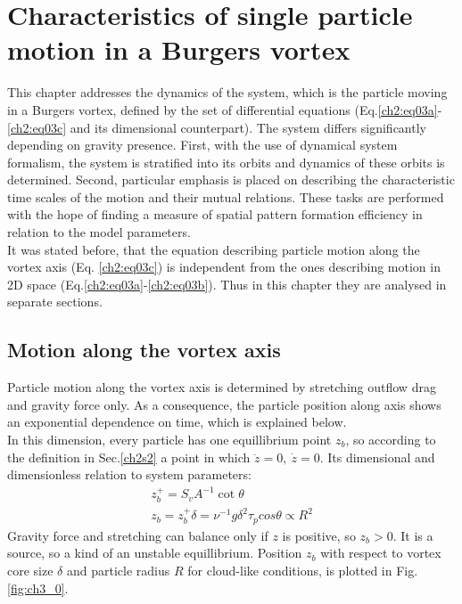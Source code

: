 \documentclass[../main.tex]{subfiles}
\begin{document}
\chapter{Characteristics of single particle motion in a Burgers vortex} %

\label{ch:single} %

This chapter addresses the dynamics of the system, which is the particle moving in a Burgers vortex, defined by the set of differential equations (Eq.\ref{ch2:eq03a}-\ref{ch2:eq03c} and its dimensional counterpart). The system differs significantly depending on gravity presence. First, with the use of dynamical system formalism, the system is stratified into its orbits and dynamics of these orbits is determined. Second, particular emphasis is placed on describing the characteristic time scales of the motion and their mutual relations. These tasks are performed with the hope of finding a measure of spatial pattern formation efficiency in relation to the model parameters.\\
It was stated before, that the equation describing particle motion along the vortex axis (Eq. \ref{ch2:eq03c}) is independent from the ones describing motion in 2D space (Eq.\ref{ch2:eq03a}-\ref{ch2:eq03b}). Thus in this chapter they are analysed in separate sections.
 
\section{Motion along the vortex axis}
Particle motion along the vortex axis is determined by stretching outflow drag and gravity force only. As a consequence, the particle position along axis shows an exponential dependence on time, which is explained below.\\
In this dimension, every particle has one equillibrium point $z_b$, so according to the definition in Sec.\ref{ch2s2} a point in which $\ddot{z}=0,\ \dot{z}=0$. Its dimensional and dimensionless relation to system parameters:
\begin{align}
z^+_b=S_v A^{-1} \cot\theta\\
z_b=z^+_b \delta=\nu^{-1}g \delta^2 \tau_p cos\theta \propto R^2
\label{def:z_b}
\end{align}
Gravity force and stretching can balance only if $z$ is positive, so $z_b>0$. It is a source, so a kind of an unstable equillibrium. Position $z_b$ with respect to vortex core size $\delta$ and particle radius $R$ for cloud-like conditions, is plotted in Fig.\ref{fig:ch3_0}.
\end{document}
